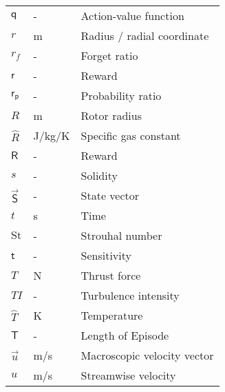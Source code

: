 \begin{longtable}{p{5cm}p{4cm}p{5cm}}
    $\mathsf{q}$			& \si{-}		& Action-value function \\
    $r$						& \si{m}		& Radius / radial coordinate \\
    $r_f$					& \si{-}		& Forget ratio \\
    $\mathsf{r}$			& \si{-}		& Reward \\	
    $\mathsf{r_p}$			& \si{-}		& Probability ratio \\
    $R$						& \si{m}		& Rotor radius \\
    $\hat{R}$               & \si{J/kg/K} & Specific gas constant \\ 
    $\mathsf{R}$			& \si{-}		& Reward \\	
    $s$						& \si{-}		& Solidity \\
    $\vec{\mathsf{S}}$		& \si{-}		& State vector \\
    $t$                     & \si{s}      & Time  \\
    $\mathrm{St}$			& \si{-}		& Strouhal number \\
    $\mathsf{t}$			& \si{-}		& Sensitivity \\
    $T$                     & \si{N}      & Thrust force \\
    $TI$					& \si{-}		& Turbulence intensity \\
    $\hat{T}$				& \si{K}		& Temperature \\
    $\mathsf{T}$			& \si{-}		& Length of Episode \\
    $\vec{u}$               & \si{m/s}    & Macroscopic velocity vector \\
    $u$                     & \si{m/s}    & Streamwise velocity \\

\end{longtable}
